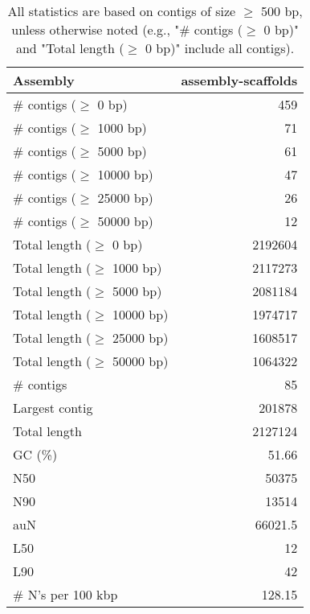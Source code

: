 \documentclass[12pt,a4paper]{article}
\begin{document}
\begin{table}[ht]
\begin{center}
\caption{All statistics are based on contigs of size $\geq$ 500 bp, unless otherwise noted (e.g., "\# contigs ($\geq$ 0 bp)" and "Total length ($\geq$ 0 bp)" include all contigs).}
\begin{tabular}{|l*{1}{|r}|}
\hline
Assembly & assembly-scaffolds \\ \hline
\# contigs ($\geq$ 0 bp) & 459 \\ \hline
\# contigs ($\geq$ 1000 bp) & 71 \\ \hline
\# contigs ($\geq$ 5000 bp) & 61 \\ \hline
\# contigs ($\geq$ 10000 bp) & 47 \\ \hline
\# contigs ($\geq$ 25000 bp) & 26 \\ \hline
\# contigs ($\geq$ 50000 bp) & 12 \\ \hline
Total length ($\geq$ 0 bp) & 2192604 \\ \hline
Total length ($\geq$ 1000 bp) & 2117273 \\ \hline
Total length ($\geq$ 5000 bp) & 2081184 \\ \hline
Total length ($\geq$ 10000 bp) & 1974717 \\ \hline
Total length ($\geq$ 25000 bp) & 1608517 \\ \hline
Total length ($\geq$ 50000 bp) & 1064322 \\ \hline
\# contigs & 85 \\ \hline
Largest contig & 201878 \\ \hline
Total length & 2127124 \\ \hline
GC (\%) & 51.66 \\ \hline
N50 & 50375 \\ \hline
N90 & 13514 \\ \hline
auN & 66021.5 \\ \hline
L50 & 12 \\ \hline
L90 & 42 \\ \hline
\# N's per 100 kbp & 128.15 \\ \hline
\end{tabular}
\end{center}
\end{table}
\end{document}
